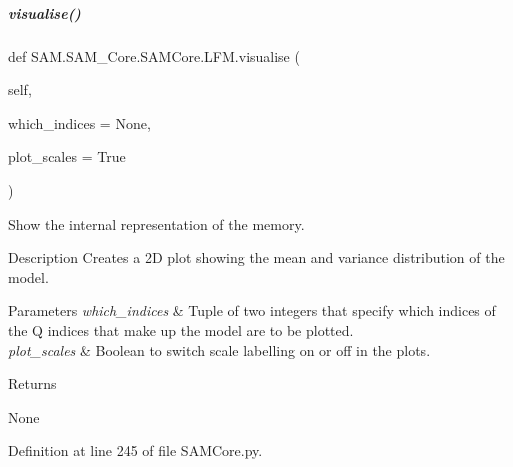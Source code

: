 \mbox{\label{group__icubclient__SAM__Core_afa85fe0230d0040053b45c92baed00c4}} 
\subparagraph{\texorpdfstring{visualise()}{visualise()}}
{\footnotesize\ttfamily def S\+A\+M.\+S\+A\+M\+\_\+\+Core.\+S\+A\+M\+Core.\+L\+F\+M.\+visualise (\begin{DoxyParamCaption}\item[{}]{self,  }\item[{}]{which\+\_\+indices = {\ttfamily None},  }\item[{}]{plot\+\_\+scales = {\ttfamily True} }\end{DoxyParamCaption})}



Show the internal representation of the memory. 

\begin{DoxyParagraph}{Description}
Creates a 2D plot showing the mean and variance distribution of the model.
\end{DoxyParagraph}

\begin{DoxyParams}{Parameters}
{\em which\+\_\+indices} & Tuple of two integers that specify which indices of the {\ttfamily Q} indices that make up the model are to be plotted. \\
\hline
{\em plot\+\_\+scales} & Boolean to switch scale labelling on or off in the plots.\\
\hline
\end{DoxyParams}
\begin{DoxyReturn}{Returns}


None 
\end{DoxyReturn}


Definition at line 245 of file S\+A\+M\+Core.\+py.

